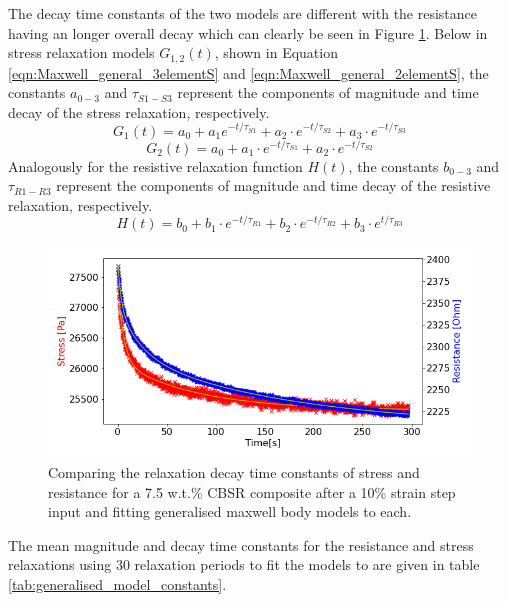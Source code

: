 The decay time constants of the two models are different with the resistance having an longer overall decay which can clearly be seen in Figure \ref{fig:diff_tau_res_stress}. Below in stress relaxation models $G_{1,2}(t)$, shown in Equation \ref{eqn:Maxwell_general_3elementS} and \ref{eqn:Maxwell_general_2elementS}, the constants $a_{0-3}$ and $\tau_{S1-S3}$ represent the components of magnitude and time decay of the stress relaxation, respectively.
\begin{equation}
	G_1(t) = a_0 + a_1e^{-t/\tau_{S1}} + a_2 \cdot e^{-t/\tau_{S2}} + a_3 \cdot e^{-t/\tau_{S3}}
	\label{eqn:Maxwell_general_3elementS} 
\end{equation}
\begin{equation}
	G_2(t) = a_0 + a_1 \cdot e^{-t/\tau_{S1}} + a_2 \cdot e^{-t/\tau_{S2}}
	\label{eqn:Maxwell_general_2elementS} 
\end{equation}
Analogously for the resistive relaxation function $H(t)$, the constants $b_{0-3}$ and $\tau_{R1-R3}$ represent the components of magnitude and time decay of the resistive relaxation, respectively. 
\begin{equation}
	H(t) = b_0 + b_1 \cdot e^{-t/\tau_{R1}} + b_2 \cdot e^{-t/\tau_{R2}} + b_3 \cdot e^{t/\tau_{R3}}
	\label{eqn:Maxwell_general_3elementR} 
\end{equation}
\begin{figure}[H]
	\centering
	\includegraphics[width=0.9\linewidth]{Figures/diff_time_const_Res_Stress_2_7-5_Epin_20mm_v3_pulse_6.png}
	\caption{Comparing the relaxation decay time constants of stress and resistance for a 7.5 w.t.\% CBSR composite after a 10\% strain step input and fitting generalised maxwell body models to each.}
	\label{fig:diff_tau_res_stress}
\end{figure}
The mean magnitude and decay time constants for the resistance and stress relaxations using 30 relaxation periods to fit the models to are given in table \ref{tab:generalised_model_constants}.

